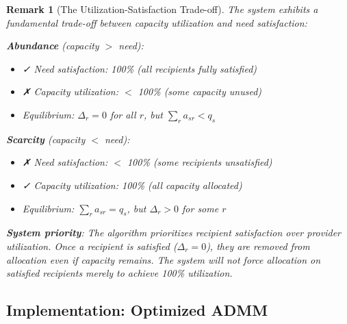 \documentclass[11pt]{article}
\newtheorem{remark}{Remark}
\begin{document}
\begin{remark}[The Utilization-Satisfaction Trade-off]
The system exhibits a fundamental trade-off between capacity utilization and need satisfaction:

\textbf{Abundance} (capacity $>$ need):
\begin{itemize}
\item ✓ Need satisfaction: 100\% (all recipients fully satisfied)
\item ✗ Capacity utilization: $<$ 100\% (some capacity unused)
\item Equilibrium: $\Delta_r = 0$ for all $r$, but $\sum_r a_{sr} < q_s$
\end{itemize}

\textbf{Scarcity} (capacity $<$ need):
\begin{itemize}
\item ✗ Need satisfaction: $<$ 100\% (some recipients unsatisfied)
\item ✓ Capacity utilization: 100\% (all capacity allocated)
\item Equilibrium: $\sum_r a_{sr} = q_s$, but $\Delta_r > 0$ for some $r$
\end{itemize}

\textbf{System priority}: The algorithm prioritizes recipient satisfaction over provider utilization. Once a recipient is satisfied ($\Delta_r = 0$), they are removed from allocation even if capacity remains. The system will not force allocation on satisfied recipients merely to achieve 100\% utilization.
\end{remark}

\subsection{Implementation: Optimized ADMM}
\end{document}
